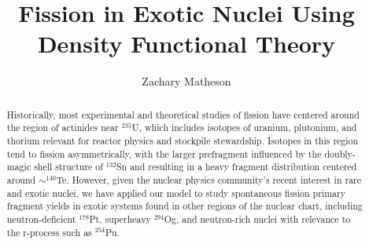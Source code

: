 \documentclass{msuphddissertation}
\author{Zachary Matheson} %
\title{Fission in Exotic Nuclei Using Density Functional Theory} %
\newcommand{\Og}{$^{294}$Og}
\newcommand{\Pt}{$^{178}$Pt}
\begin{document}
\maketitlepage %


\begin{abstract}
Historically, most experimental and theoretical studies of fission have centered around the region of actinides near $^{235}$U, which includes isotopes of uranium, plutonium, and thorium relevant for reactor physics and stockpile stewardship. Isotopes in this region tend to fission asymmetrically, with the larger prefragment influenced by the doubly-magic shell structure of $^{132}$Sn and resulting in a heavy fragment distribution centered around ${\sim}^{140}$Te. However, given the nuclear physics community's recent interest in rare and exotic nuclei, we have applied our model to study spontaneous fission primary fragment yields in exotic systems found in other regions of the nuclear chart, including neutron-deficient {\Pt}, superheavy {\Og}, and neutron-rich nuclei with relevance to the r-process such as $^{254}$Pu.
\end{abstract}

\end{document}
